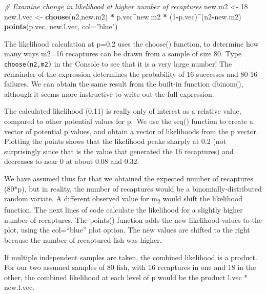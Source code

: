 \documentclass[
]{krantz}
\makeatletter
\newenvironment{Shaded}{\begin{snugshade}}{\end{snugshade}}
\newcommand{\AttributeTok}[1]{\textcolor[rgb]{0.27,0.27,0.27}{#1}}
\newcommand{\CommentTok}[1]{\textcolor[rgb]{0.37,0.37,0.37}{\textit{#1}}}
\newcommand{\DecValTok}[1]{\textcolor[rgb]{0.06,0.06,0.06}{#1}}
\newcommand{\FunctionTok}[1]{\textcolor[rgb]{0.27,0.27,0.27}{\textbf{#1}}}
\newcommand{\NormalTok}[1]{#1}
\newcommand{\OtherTok}[1]{\textcolor[rgb]{0.37,0.37,0.37}{#1}}
\newcommand{\SpecialCharTok}[1]{\textcolor[rgb]{0.43,0.43,0.43}{\textbf{#1}}}
\newcommand{\StringTok}[1]{\textcolor[rgb]{0.5,0.5,0.5}{#1}}
\newenvironment{kframe}{%
\medskip{}
\setlength{\fboxsep}{.8em}
 \def\at@end@of@kframe{}%
 \ifinner\ifhmode%
  \def\at@end@of@kframe{\end{minipage}}%
  \begin{minipage}{\columnwidth}%
 \fi\fi%
 \def\FrameCommand##1{\hskip\@totalleftmargin \hskip-\fboxsep
 \colorbox{shadecolor}{##1}\hskip-\fboxsep
     \hskip-\linewidth \hskip-\@totalleftmargin \hskip\columnwidth}%
 \MakeFramed {\advance\hsize-\width
   \@totalleftmargin\z@ \linewidth\hsize
   \@setminipage}}%
 {\par\unskip\endMakeFramed%
 \at@end@of@kframe}
\renewenvironment{Shaded}{\begin{kframe}}{\end{kframe}}
\makeatother
\begin{document}
\begin{Shaded}
\begin{Highlighting}[]
\CommentTok{\# Examine change in likelihood at higher number of recaptures}
\NormalTok{new.m2 }\OtherTok{\textless{}{-}} \DecValTok{18}
\NormalTok{new.l.vec }\OtherTok{\textless{}{-}} \FunctionTok{choose}\NormalTok{(n2,new.m2) }\SpecialCharTok{*}\NormalTok{ p.vec}\SpecialCharTok{\^{}}\NormalTok{new.m2 }\SpecialCharTok{*}\NormalTok{ (}\DecValTok{1}\SpecialCharTok{{-}}\NormalTok{p.vec)}\SpecialCharTok{\^{}}\NormalTok{(n2}\SpecialCharTok{{-}}\NormalTok{new.m2)}
\FunctionTok{points}\NormalTok{(p.vec, new.l.vec, }\AttributeTok{col=}\StringTok{"blue"}\NormalTok{)}
\end{Highlighting}
\end{Shaded}

The likelihood calculation at p=0.2 uses the choose() function, to determine how many ways m2=16 recaptures can be drawn from a sample of size 80. Type \texttt{choose(n2,m2)} in the Console to see that it is a very large number! The remainder of the expression determines the probability of 16 successes and 80-16 failures. We can obtain the same result from the built-in function dbinom(), although it seems more instructive to write out the full expression.

The calculated likelihood (0.11) is really only of interest as a relative value, compared to other potential values for p.~We use the seq() function to create a vector of potential p values, and obtain a vector of likelihoods from the p vector. Plotting the points shows that the likelihood peaks sharply at 0.2 (not surprisingly since that is the value that generated the 16 recaptures) and decreases to near 0 at about 0.08 and 0.32.

We have assumed thus far that we obtained the expected number of recaptures (80*p), but in reality, the number of recaptures would be a binomially-distributed random variate. A different observed value for m\textsubscript{2} would shift the likelihood function. The next lines of code calculate the likelihood for a slightly higher number of recaptures. The points() function adds the new likelihood values to the plot, using the col=``blue'' plot option. The new values are shifted to the right because the number of recaptured fish was higher.

If multiple independent samples are taken, the combined likelihood is a product. For our two assumed samples of 80 fish, with 16 recaptures in one and 18 in the other, the combined likelihood at each level of p would be the product l.vec * new.l.vec.
\end{document}
